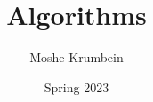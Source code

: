 
\usepackage{subfiles}

\title{Algorithms}
\def \thecoursenum {67504}
\def \theinstructor {Yuval Rabani}
\author{Moshe Krumbein}
\date{Spring 2023}





\setcounter{tocdepth}{2}
\tableofcontents
\cleardoublepage




